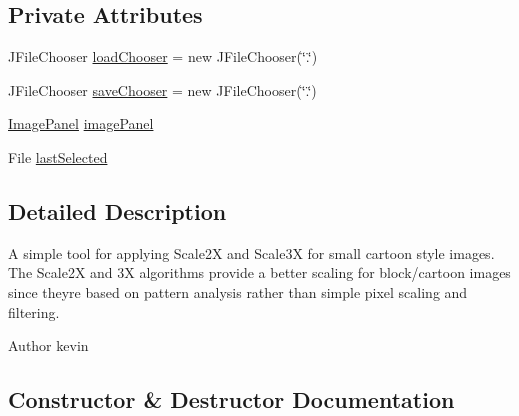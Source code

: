 \subsection*{Private Attributes}
\begin{DoxyCompactItemize}
\item 
J\+File\+Chooser \mbox{\hyperlink{classorg_1_1newdawn_1_1slick_1_1tools_1_1scalar_1_1_scalar_a36ca61e15f5624af75dfa66a9212e97e}{load\+Chooser}} = new J\+File\+Chooser(\char`\"{}.\char`\"{})
\item 
J\+File\+Chooser \mbox{\hyperlink{classorg_1_1newdawn_1_1slick_1_1tools_1_1scalar_1_1_scalar_aaba5299d75aaf1c811ea0a7395ef2afb}{save\+Chooser}} = new J\+File\+Chooser(\char`\"{}.\char`\"{})
\item 
\mbox{\hyperlink{classorg_1_1newdawn_1_1slick_1_1tools_1_1scalar_1_1_image_panel}{Image\+Panel}} \mbox{\hyperlink{classorg_1_1newdawn_1_1slick_1_1tools_1_1scalar_1_1_scalar_a660c23cbae7b52f06768db8e8841bc39}{image\+Panel}}
\item 
File \mbox{\hyperlink{classorg_1_1newdawn_1_1slick_1_1tools_1_1scalar_1_1_scalar_a4259f6e51797ec01cafec826854c94a4}{last\+Selected}}
\end{DoxyCompactItemize}


\subsection{Detailed Description}
A simple tool for applying Scale2X and Scale3X for small cartoon style images. The Scale2X and 3X algorithms provide a better scaling for block/cartoon images since they\textquotesingle{}re based on pattern analysis rather than simple pixel scaling and filtering.

\begin{DoxyAuthor}{Author}
kevin 
\end{DoxyAuthor}


\subsection{Constructor \& Destructor Documentation}
\mbox{\label{classorg_1_1newdawn_1_1slick_1_1tools_1_1scalar_1_1_scalar_a9041a9bf0c10b24ed8d96c6acd056019}} 
